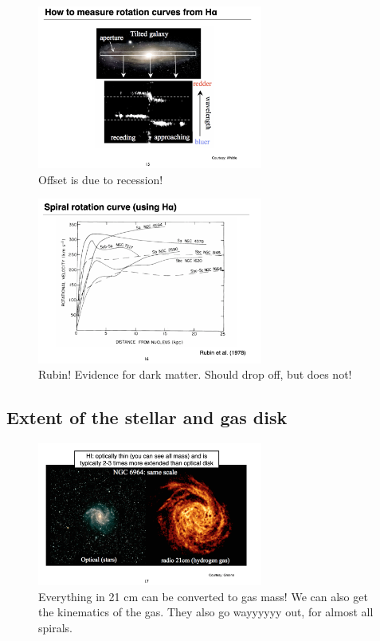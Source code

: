 \documentclass{article}
\begin{document}
\begin{figure}
    \centering
    \includegraphics[width=0.66\textwidth]{figs/Screen Shot 2021-10-22 at 10.10.40 AM.png}
    \caption{Offset is due to recession!}
    \label{fig:rot_crves_disks}
\end{figure}

\begin{figure}
    \centering
    \includegraphics[width=0.66\textwidth]{figs/Screen Shot 2021-10-22 at 10.12.15 AM.png}
    \caption{Rubin! Evidence for dark matter. Should drop off, but does not!}
    \label{fig:vera_rubin}
\end{figure}

\subsection{Extent of the stellar and gas disk}

\begin{figure}
    \centering
    \includegraphics[width=0.66\textwidth]{figs/Screen Shot 2021-10-22 at 10.12.59 AM.png}
    \caption{Everything in 21 cm can be converted to gas mass! We can also get the kinematics of the gas. They also go wayyyyyy out, for almost all spirals.}
    \label{fig:21cm_disks}
\end{figure}
\end{document}
